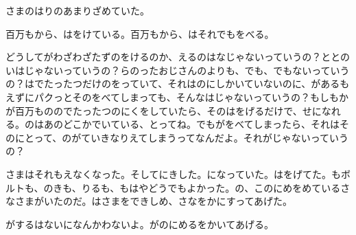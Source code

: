 さまのはりのあまりざめていた。

百万もから、はをけている。百万もから、はそれでもをべる。

どうしてがわざわざたずのをけるのか、えるのはなじゃないっていうの？ととのいはじゃないっていうの？らのったおじさんのよりも、でも、でもないっていうの？はでたったつだけのをっていて、それはのにしかいていないのに、があるもえずにパクっとそのをべてしまっても、そんなはじゃないっていうの？もしもかが百万もののでたったつのにくをしていたら、そのはをげるだけで、せになれる。のはあのどこかでいている、とってね。でもがをべてしまったら、それはそのにとって、のがていきなりえてしまうってなんだよ。それがじゃないっていうの？

さまはそれもえなくなった。そしてにきした。になっていた。はをげてた。もボルトも、のきも、りるも、もはやどうでもよかった。の、このにめをめているさなさまがいたのだ。はさまをできしめ、さなをかにすってあげた。

がするはないになんかわないよ。がのにめるをかいてあげる。


